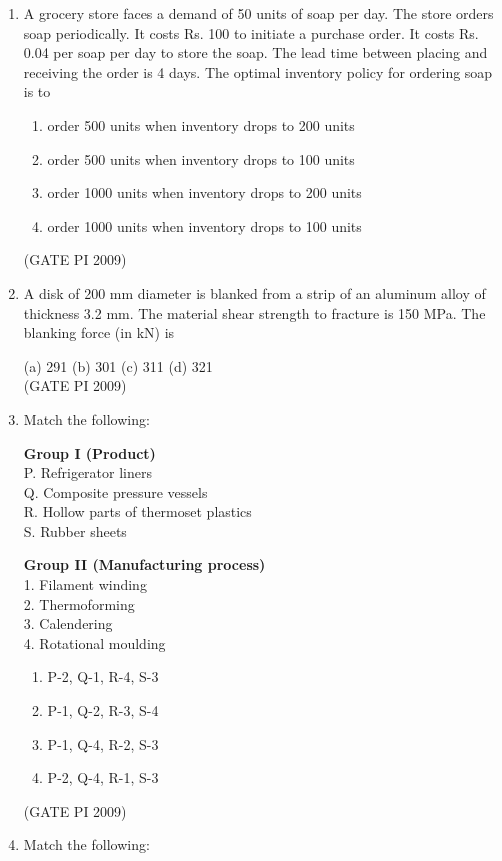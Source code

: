 \documentclass[journal,12pt,onecolumn]{IEEEtran}
\theoremstyle{remark}
\begin{document}
\begin{enumerate}[label=Q.\arabic*]
(a) 0.10 \hfill (b) 0.25 \hfill C) 0.40 \hfill (d) 0.75 \\

\hfill (GATE PI 2009)
\item A grocery store faces a demand of 50 units of soap per day. The store orders soap periodically. It costs Rs. 100 to initiate a purchase order. It costs Rs. 0.04 per soap per day to store the soap. The lead time between placing and receiving the order is 4 days. The optimal inventory policy for ordering soap is to
\begin{enumerate}
\item order 500 units when inventory drops to 200 units 
\item order 500 units when inventory drops to 100 units
\item order 1000 units when inventory drops to 200 units
\item order 1000 units when inventory drops to 100 units
\end{enumerate}
\hfill (GATE PI 2009)
\item A disk of 200 mm diameter is blanked from a strip of an aluminum alloy of thickness 3.2 mm. The material shear strength to fracture is 150 MPa. The blanking force (in kN) is

(a) 291 \hfill (b) 301 \hfill(c) 311 \hfill (d) 321  \\

\hfill (GATE PI 2009)
\noindent 
\item Match the following:

\noindent
\begin{minipage}[t]{0.45\textwidth}
\textbf{Group I (Product)}\\[0.5em]
P. Refrigerator liners \\
Q. Composite pressure vessels \\
R. Hollow parts of thermoset plastics \\
S. Rubber sheets
\end{minipage}
\hfill
\begin{minipage}[t]{0.45\textwidth}
\textbf{Group II (Manufacturing process)}\\[0.5em]
1. Filament winding \\
2. Thermoforming \\
3. Calendering \\
4. Rotational moulding
\end{minipage}

\begin{multicols}{2}
\begin{enumerate}
    \item P-2, Q-1, R-4, S-3
    \item P-1, Q-2, R-3, S-4
    \item P-1, Q-4, R-2, S-3
    \item P-2, Q-4, R-1, S-3
\end{enumerate}
\end{multicols}
\hfill (GATE PI 2009)
\noindent 
\item Match the following:


\end{enumerate}
\end{document}
